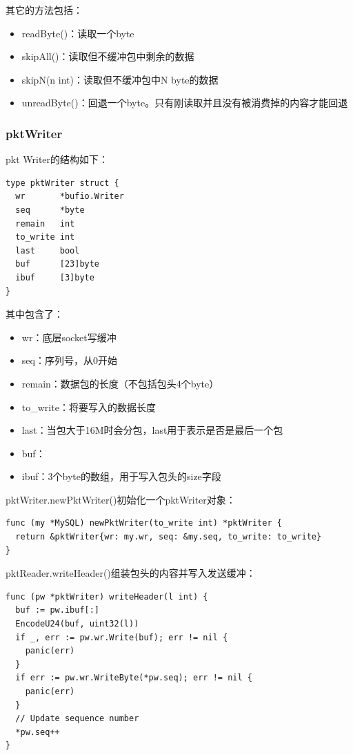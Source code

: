 \documentclass[a4paper, titlepage, 10pt, bookmark]{article}
\begin{document}
其它的方法包括：
\begin{itemize}
    \item readByte()：读取一个byte
    \item skipAll()：读取但不缓冲包中剩余的数据
    \item skipN(n int)：读取但不缓冲包中N byte的数据
    \item unreadByte()：回退一个byte。只有刚读取并且没有被消费掉的内容才能回退
\end{itemize}

\subsubsection{pktWriter}
pkt Writer的结构如下：
\begin{spacing}{1.0}
\begin{lstlisting}
type pktWriter struct {
  wr       *bufio.Writer
  seq      *byte
  remain   int
  to_write int
  last     bool
  buf      [23]byte
  ibuf     [3]byte
}
\end{lstlisting}
\end{spacing}

其中包含了：
\begin{itemize}
    \item wr：底层socket写缓冲
    \item seq：序列号，从0开始
    \item remain：数据包的长度（不包括包头4个byte）
    \item to\_write：将要写入的数据长度
    \item last：当包大于16M时会分包，last用于表示是否是最后一个包
    \item buf：
    \item ibuf：3个byte的数组，用于写入包头的size字段
\end{itemize}

pktWriter.newPktWriter()初始化一个pktWriter对象：
\begin{spacing}{1.0}
\begin{lstlisting}
func (my *MySQL) newPktWriter(to_write int) *pktWriter {
  return &pktWriter{wr: my.wr, seq: &my.seq, to_write: to_write}
}
\end{lstlisting}
\end{spacing}

pktReader.writeHeader()组装包头的内容并写入发送缓冲：
\begin{spacing}{1.0}
\begin{lstlisting}
func (pw *pktWriter) writeHeader(l int) {
  buf := pw.ibuf[:]
  EncodeU24(buf, uint32(l))
  if _, err := pw.wr.Write(buf); err != nil {
    panic(err)
  }
  if err := pw.wr.WriteByte(*pw.seq); err != nil {
    panic(err)
  }
  // Update sequence number
  *pw.seq++
}
\end{lstlisting}
\end{spacing}
\end{document}
